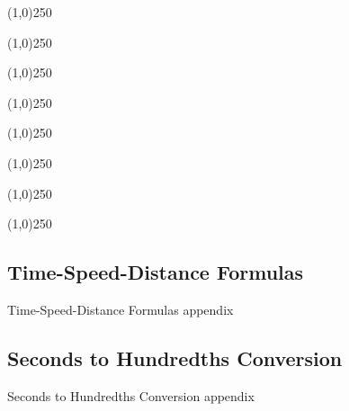 \documentclass[letterpaper,11pt]{article}
\begin{document}
\cleardoublepage


\tableofcontents

\cleardoublepage

\pagestyle{plain}


\begin{center}
\line(1,0){250}
\end{center}


\begin{center}
\line(1,0){250}
\end{center}


\begin{center}
\line(1,0){250}
\end{center}


\begin{center}
\line(1,0){250}
\end{center}


\begin{center}
\line(1,0){250}
\end{center}


\begin{center}
\line(1,0){250}
\end{center}


\begin{center}
\line(1,0){250}
\end{center}


\begin{center}
\line(1,0){250}
\end{center}


\subsection{Time-Speed-Distance Formulas}

Time-Speed-Distance Formulas appendix

\subsection{Seconds to Hundredths Conversion}

Seconds to Hundredths Conversion appendix

\clearpage

\hbox{}\clearpage\hbox{}\cleardoublepage
\end{document}
